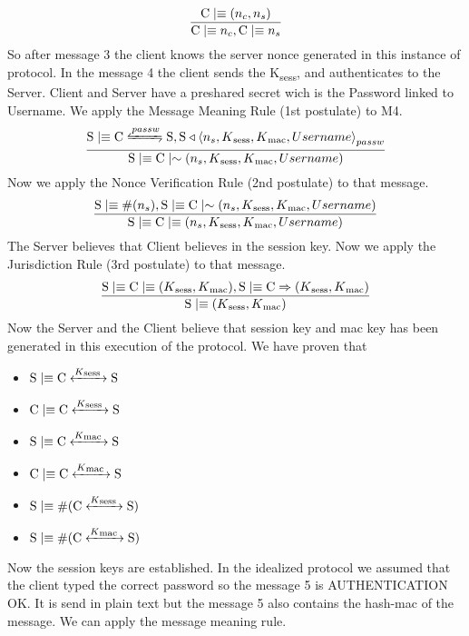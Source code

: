 \[ \frac{\textnormal{C} \mid\equiv (n_c,n_s)}{\textnormal{C} \mid\equiv n_c, \textnormal{C} \mid\equiv n_s}\]
So after message 3 the client knows the server nonce generated in this instance of protocol. In the message 4 the client sends the K\textsubscript{sess}, and authenticates to the Server. Client and Server have a preshared secret wich is the Password linked to Username. We apply the Message Meaning Rule (1st postulate) to M4.
\[ \frac{\textnormal{S} \believes \textnormal{C} \secret{passw} \textnormal{S}, \textnormal{S} \sees \combine{n_s,K\textsubscript{sess},K\textsubscript{mac},Username}{passw}}{\textnormal{S}\believes \textnormal{C} \oncesaid (n_s,K\textsubscript{sess},K\textsubscript{mac},Username)} \]
Now we apply the Nonce Verification Rule (2nd postulate) to that message.
\[ \frac{\textnormal{S}\mid\equiv \#(n_s), \textnormal{S} \mid\equiv \textnormal{C} \mid\sim (n_s,K\textsubscript{sess},K\textsubscript{mac},Username)}
   {\textnormal{S} \mid\equiv \textnormal{C} \mid\equiv (n_s,K\textsubscript{sess},K\textsubscript{mac},Username)}	\]
The Server believes that Client believes in the session key. Now we apply the Jurisdiction Rule (3rd postulate) to that message.
\[ \frac{\textnormal{S} \mid\equiv \textnormal{C} \mid\equiv (K\textsubscript{sess},K\textsubscript{mac}), \textnormal{S} \mid\equiv \textnormal{C} \Rightarrow (K\textsubscript{sess},K\textsubscript{mac})}
        {\textnormal{S} \mid\equiv (K\textsubscript{sess},K\textsubscript{mac}) } \]
Now the Server and the Client believe that session key and mac key has been generated in this execution of the protocol. We have proven that
\begin{itemize}
	\item \(\textnormal{S} \mid\equiv \textnormal{C} \xleftrightarrow{K\textsubscript{sess }} \textnormal{S}\)
	\item \(\textnormal{C} \mid\equiv \textnormal{C} \xleftrightarrow{K\textsubscript{sess }} \textnormal{S}\)
	\item \(\textnormal{S} \mid\equiv \textnormal{C} \xleftrightarrow{K\textsubscript{mac }} \textnormal{S}\)
	\item \(\textnormal{C} \mid\equiv \textnormal{C} \xleftrightarrow{K\textsubscript{mac }} \textnormal{S}\) 
	\item \(\textnormal{S} \mid\equiv \#(\textnormal{C} \xleftrightarrow{K\textsubscript{sess }} \textnormal{S})\)
	\item \(\textnormal{S} \mid\equiv \#(\textnormal{C} \xleftrightarrow{K\textsubscript{mac }} \textnormal{S})\)
\end{itemize}
Now the session keys are established. In the idealized protocol we assumed that the client typed the correct password so the message 5 is AUTHENTICATION OK. It is send in plain text but the message 5 also contains the hash-mac of the message. We can apply the message meaning rule.
